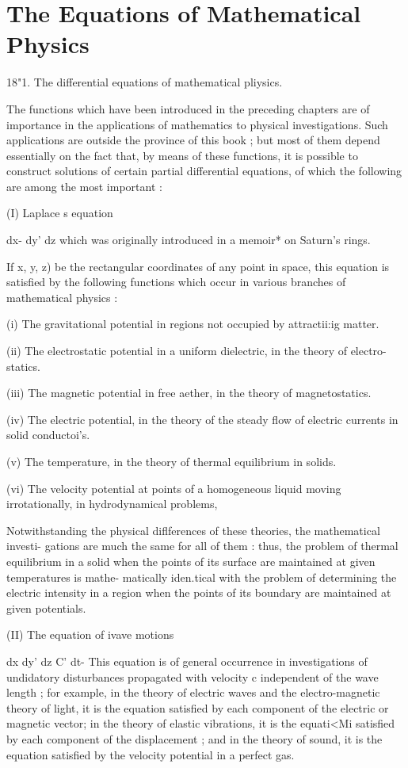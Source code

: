 \chapter{The Equations of Mathematical Physics} 

18"1. The differential equations of mathematical pliysics. 

The functions which have been introduced in the preceding chapters are 
of importance in the applications of mathematics to physical investigations. 
Such applications are outside the province of this book ; but most of them 
depend essentially on the fact that, by means of these functions, it is possible 
to construct solutions of certain partial differential equations, of which the 
following are among the most important : 

(I) Laplace s equation 

dx- dy'  dz  
which was originally introduced in a memoir* on Saturn's rings. 

If  x, y, z) be the rectangular coordinates of any point in space, this equation is 
satisfied by the following functions which occur in various branches of mathematical 
physics : 

(i) The gravitational potential in regions not occupied by attractii:ig matter. 

(ii) The electrostatic potential in a uniform dielectric, in the theory of electro- 
statics. 

(iii) The magnetic potential in free aether, in the theory of magnetostatics. 

(iv) The electric potential, in the theory of the steady flow of electric currents in 
solid conductoi's. 

(v) The temperature, in the theory of thermal equilibrium in solids. 

(vi) The velocity potential at points of a homogeneous liquid moving irrotationally, 
in hydrodynamical problems, 

Notwithstanding the physical diflferences of these theories, the mathematical investi- 
gations are much the same for all of them : thus, the problem of thermal equilibrium in a 
solid when the points of its surface are maintained at given temperatures is mathe- 
matically iden.tical with the problem of determining the electric intensity in a region 
when the points of its boundary are maintained at given potentials. 

(II) The equation of ivave motions 

dx  dy'  dz  C' dt- 
This equation is of general occurrence in investigations of undidatory disturbances 
propagated with velocity c independent of the wave length ; for example, in the theory of 
electric waves and the electro-magnetic theory of light, it is the equation satisfied by each 
component of the electric or magnetic vector; in the theory of elastic vibrations, it 
is the equati<Mi satisfied by each component of the displacement ; and in the theory 
of sound, it is the equation satisfied by the velocity potential in a perfect gas. 

